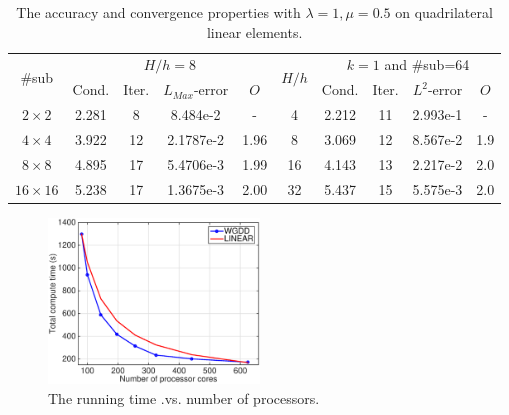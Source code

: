 								\vspace{5mm}
								\begin{table}[H]
									\small
									\vspace{-10pt}
									\setlength{\tabcolsep}{1pt} {
										
										\vspace{-5pt}
										\begin{center}
											\begin{tabular}{c|cccc|c|cccc}
												\hline
												\multirow{2}{*}{\#sub} &\multicolumn{4}{c|}{ $H/h=8$} &\multirow{2}{*}{$H/h$} &\multicolumn{4}{c}{$k=1$ and \#sub=64}\\ 
												& Cond.   & Iter. &$L_{Max}$-error & $O$& & Cond.   & Iter. &$L^2$-error & $O$ \\
												
												\hline
												$2\times 2$     & 2.281 & 8   & 8.484e-2 & - & 4   & 2.212 &11 & 2.993e-1 &- \\
												$4\times 4$     &3.922 &12 &2.1787e-2 & 1.96 & 8   & 3.069 &12 & 8.567e-2 & 1.9  \\
												$8\times 8$  & 4.895 &17 &5.4706e-3 & 1.99 & 16   & 4.143 &13 & 2.217e-2 & 2.0 \\
												$16\times 16$ &5.238&17 &1.3675e-3 & 2.00 & 32   & 5.437 &15 & 5.575e-3 & 2.0 \\
												\hline	
											\end{tabular}
										\end{center} }
										\caption{The accuracy and convergence properties with $ \lambda = 1, \mu = 0.5 $ on quadrilateral linear elements.}
										\label{Tab:case1_PkPkPk linear}
									\end{table}
									
									
									\begin{figure}[H]
										\centering
										\includegraphics[width=0.5\textwidth]{./pics/p1time.eps} 
										\caption{\footnotesize The running time .vs. number of processors.}\label{fig9: time}
									\end{figure}
									
